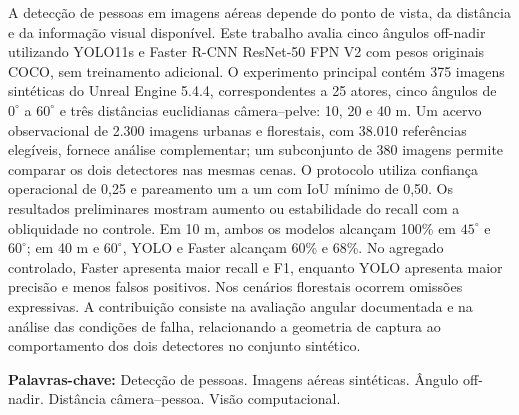 \begin{resumo}
A detecção de pessoas em imagens aéreas depende do ponto de vista, da distância e da informação visual disponível. Este trabalho avalia cinco ângulos off-nadir utilizando YOLO11s e Faster R-CNN ResNet-50 FPN V2 com pesos originais COCO, sem treinamento adicional. O experimento principal contém 375 imagens sintéticas do Unreal Engine 5.4.4, correspondentes a 25 atores, cinco ângulos de $0^\circ$ a $60^\circ$ e três distâncias euclidianas câmera--pelve: 10, 20 e 40 m. Um acervo observacional de 2.300 imagens urbanas e florestais, com 38.010 referências elegíveis, fornece análise complementar; um subconjunto de 380 imagens permite comparar os dois detectores nas mesmas cenas. O protocolo utiliza confiança operacional de 0,25 e pareamento um a um com IoU mínimo de 0,50. Os resultados preliminares mostram aumento ou estabilidade do recall com a obliquidade no controle. Em 10 m, ambos os modelos alcançam 100\% em $45^\circ$ e $60^\circ$; em 40 m e $60^\circ$, YOLO e Faster alcançam 60\% e 68\%. No agregado controlado, Faster apresenta maior recall e F1, enquanto YOLO apresenta maior precisão e menos falsos positivos. Nos cenários florestais ocorrem omissões expressivas. A contribuição consiste na avaliação angular documentada e na análise das condições de falha, relacionando a geometria de captura ao comportamento dos dois detectores no conjunto sintético.
\par\vspace{\onelineskip}
\noindent\textbf{Palavras-chave:} Detecção de pessoas. Imagens aéreas sintéticas. Ângulo off-nadir. Distância câmera--pessoa. Visão computacional.
\end{resumo}
